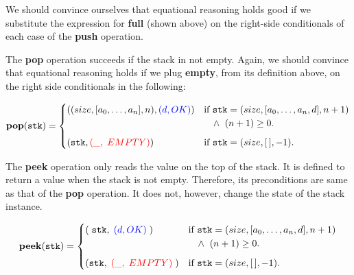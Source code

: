 \documentclass[10pt]{article}
\begin{document}
    We should convince ourselves that equational reasoning holds good if we substitute the expression for \textbf{full} (shown above) on the right-side conditionals of each case of the \textbf{push} operation. 
  
    The \textbf{pop} operation succeeds if the stack in not empty. Again, we should convince that equational reasoning holds if we plug \textbf{empty}, from its definition above, on the right side conditionals in the following: 

    \[
        \mathtt{\mathbf{pop}(stk)} = \begin{cases} ((size, [a_0, \dots, a_n], n), {\textcolor{blue}{(d, OK)}}) & \mbox{if } \mathtt{stk} = (size, [a_0,\dots,a_n, d], n+1)\\ & \hspace*{10pt}\wedge\; \; (n+1) \geq 0 . \vspace*{6pt}\\ 
        (\mathtt{stk},{\textcolor{red}{(\_,\; EMPTY)}})  & \mbox{if }\mathtt{stk} = (size, [\,], -1). \end{cases} 
    \]

    The \textbf{peek} operation only reads the value on the top of the stack. It is defined to return a value when the stack is not empty. Therefore, its preconditions are same as that of the \textbf{pop} operation. It does not, however, change the state of the stack instance.

    \[
        \mathtt{\mathbf{peek}(stk)} = \begin{cases} (\; \mathtt{stk}, \; {\textcolor{blue}{(d, OK)}}\;) & \mbox{if } \mathtt{stk} = (size, [a_0,\dots,a_n, d], n+1)\\ & \hspace*{10pt}\wedge\; \; (n+1) \geq 0 . \vspace*{6pt}\\ 
        (\mathtt{stk},\; {\textcolor{red}{(\_,\; EMPTY)}}\;)  & \mbox{if }\mathtt{stk} = (size, [\,], -1). \end{cases} 
    \]
\end{document}
